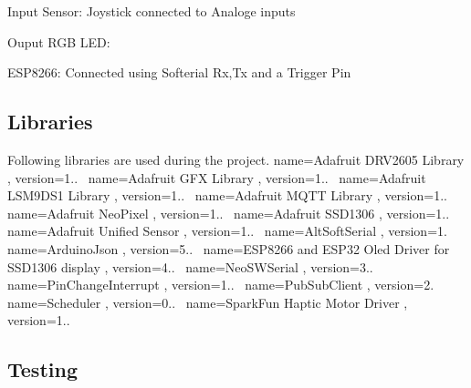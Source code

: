 \begin{DoxyEnumerate}
\item Input Sensor\+: Joystick connected to Analoge inputs~\newline

\item Ouput R\+GB L\+ED\+:~\newline

\item E\+S\+P8266\+: Connected using Softerial Rx,Tx and a Trigger Pin~\newline
 
\end{DoxyEnumerate}\hypertarget{index_libraries}{}\subsection{Libraries}\label{index_libraries}
Following libraries are used during the project. name=Adafruit D\+R\+V2605 Library , version=1..~\newline
name=Adafruit G\+FX Library , version=1..~\newline
name=Adafruit L\+S\+M9\+D\+S1 Library , version=1..~\newline
name=Adafruit M\+Q\+TT Library , version=1..~\newline
name=Adafruit Neo\+Pixel , version=1..~\newline
name=Adafruit S\+S\+D1306 , version=1..~\newline
name=Adafruit Unified Sensor , version=1..~\newline
name=Alt\+Soft\+Serial , version=1.~\newline
name=Arduino\+Json , version=5..~\newline
name=E\+S\+P8266 and E\+S\+P32 Oled Driver for S\+S\+D1306 display , version=4..~\newline
name=Neo\+S\+W\+Serial , version=3..~\newline
name=Pin\+Change\+Interrupt , version=1..~\newline
name=Pub\+Sub\+Client , version=2.~\newline
name=Scheduler , version=0..~\newline
name=Spark\+Fun Haptic Motor Driver , version=1..\hypertarget{index_testing}{}\subsection{Testing}\label{index_testing}

